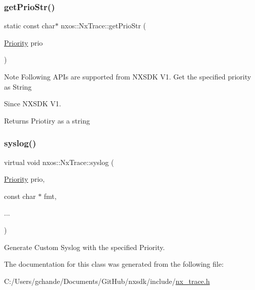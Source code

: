 \subsubsection{\texorpdfstring{get\+Prio\+Str()}{getPrioStr()}}
{\footnotesize\ttfamily static const char$\ast$ nxos\+::\+Nx\+Trace\+::get\+Prio\+Str (\begin{DoxyParamCaption}\item[{\mbox{\hyperlink{classnxos_1_1_nx_trace_a582f6e5a22e788c61807657f8bca088f}{Priority}}}]{prio }\end{DoxyParamCaption})\hspace{0.3cm}{\ttfamily [static]}}

\begin{DoxyNote}{Note}
Following A\+P\+Is are supported from N\+X\+S\+DK V1. Get the specified priority as String
\end{DoxyNote}
\begin{DoxySince}{Since}
N\+X\+S\+DK V1.
\end{DoxySince}
\begin{DoxyReturn}{Returns}
Priotiry as a string 
\end{DoxyReturn}
\mbox{\label{classnxos_1_1_nx_trace_a825db76787da234b99e81adb2def8d3d}} 
\subsubsection{\texorpdfstring{syslog()}{syslog()}}
{\footnotesize\ttfamily virtual void nxos\+::\+Nx\+Trace\+::syslog (\begin{DoxyParamCaption}\item[{\mbox{\hyperlink{classnxos_1_1_nx_trace_a582f6e5a22e788c61807657f8bca088f}{Priority}}}]{prio,  }\item[{const char $\ast$}]{fmt,  }\item[{}]{... }\end{DoxyParamCaption})\hspace{0.3cm}{\ttfamily [pure virtual]}}



Generate Custom Syslog with the specified Priority. 



The documentation for this class was generated from the following file\+:\begin{DoxyCompactItemize}
\item 
C\+:/\+Users/gchande/\+Documents/\+Git\+Hub/nxsdk/include/\mbox{\hyperlink{nx__trace_8h}{nx\+\_\+trace.\+h}}\end{DoxyCompactItemize}
